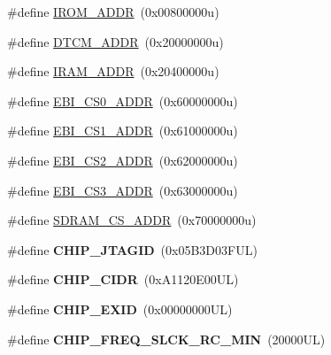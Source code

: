 \begin{DoxyCompactItemize}
\item 
\#define \mbox{\hyperlink{group__SAMS70J21__definitions_ga694212ffb8c2786bacee3d0ad6020bda}{I\+R\+O\+M\+\_\+\+A\+D\+DR}}~(0x00800000u)
\item 
\#define \mbox{\hyperlink{group__SAMS70J21__definitions_ga26626a425f7ebb3a0c2dbc276f0d9f78}{D\+T\+C\+M\+\_\+\+A\+D\+DR}}~(0x20000000u)
\item 
\#define \mbox{\hyperlink{group__SAMS70J21__definitions_gaae45ac2ef16942159481c767ac4805cf}{I\+R\+A\+M\+\_\+\+A\+D\+DR}}~(0x20400000u)
\item 
\#define \mbox{\hyperlink{group__SAMS70J21__definitions_ga9bcbb97ddae3b2cc5e2c9613d33f66b4}{E\+B\+I\+\_\+\+C\+S0\+\_\+\+A\+D\+DR}}~(0x60000000u)
\item 
\#define \mbox{\hyperlink{group__SAMS70J21__definitions_gaaddd9fdbbc77c9aced5308819f502a26}{E\+B\+I\+\_\+\+C\+S1\+\_\+\+A\+D\+DR}}~(0x61000000u)
\item 
\#define \mbox{\hyperlink{group__SAMS70J21__definitions_ga058a35f9991487dc2dd12ada792d0730}{E\+B\+I\+\_\+\+C\+S2\+\_\+\+A\+D\+DR}}~(0x62000000u)
\item 
\#define \mbox{\hyperlink{group__SAMS70J21__definitions_gad66ebdd0fc33ec3cf85dbaa14bbf05d9}{E\+B\+I\+\_\+\+C\+S3\+\_\+\+A\+D\+DR}}~(0x63000000u)
\item 
\#define \mbox{\hyperlink{group__SAMS70J21__definitions_ga61b7db25daf759c2a2beb6e5a0b57a84}{S\+D\+R\+A\+M\+\_\+\+C\+S\+\_\+\+A\+D\+DR}}~(0x70000000u)
\item 
\mbox{\label{group__SAMS70J21__definitions_gaa614519778eec0df55d3eeab3223e3f6}} 
\#define {\bfseries C\+H\+I\+P\+\_\+\+J\+T\+A\+G\+ID}~(0x05\+B3\+D03\+F\+U\+L)
\item 
\mbox{\label{group__SAMS70J21__definitions_ga1e1ae44dd9269a8a98c1d7e7a60e9fbd}} 
\#define {\bfseries C\+H\+I\+P\+\_\+\+C\+I\+DR}~(0x\+A1120\+E00\+U\+L)
\item 
\mbox{\label{group__SAMS70J21__definitions_ga35123717aa86b76bb6b73cf3adc4c2e6}} 
\#define {\bfseries C\+H\+I\+P\+\_\+\+E\+X\+ID}~(0x00000000\+U\+L)
\item 
\mbox{\label{group__SAMS70J21__definitions_ga0e868bf27426399dfdcb3a9dfc3733c4}} 
\#define {\bfseries C\+H\+I\+P\+\_\+\+F\+R\+E\+Q\+\_\+\+S\+L\+C\+K\+\_\+\+R\+C\+\_\+\+M\+IN}~(20000\+U\+L)

\end{DoxyCompactItemize}
